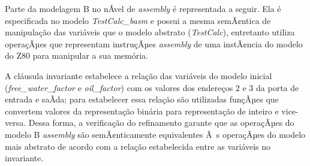 \documentclass[11pt]{article} %
\begin{document}
% 
% 
% 
% 
% 
% 
% 
% 
% 
% 

Parte da modelagem B no nÃ­vel de \textit{assembly} é representada a seguir. Ela é especificada no modelo
\textit{TestCalc\_basm} e possui a mesma semÃ¢ntica de manipulação das variáveis que o modelo abstrato
(\textit{TestCalc}), entretanto utiliza operaçÃµes que representam instruçÃµes \textit{assembly} de
uma instÃ¢ncia do modelo do Z80 para manipular a sua memória. 

A cláusula invariante estabelece a relação das variáveis do modelo inicial (\textit{free\_water\_factor} e
\textit{oil\_factor}) com os valores dos endereços 2 e 3 da porta de entrada e saÃ­da; para estabelecer
essa relação são utilizadas funçÃµes que convertem valores da representação binária para representação de
inteiro e vice-versa. Dessa forma, a verificação do refinamento garante que as operaçÃµes do modelo B
\textit{assembly} são semÃ¢nticamente equivalentes  Ã s operaçÃµes do modelo mais abstrato de acordo com a
relação estabelecida entre as variáveis no invariante.
\end{document}
